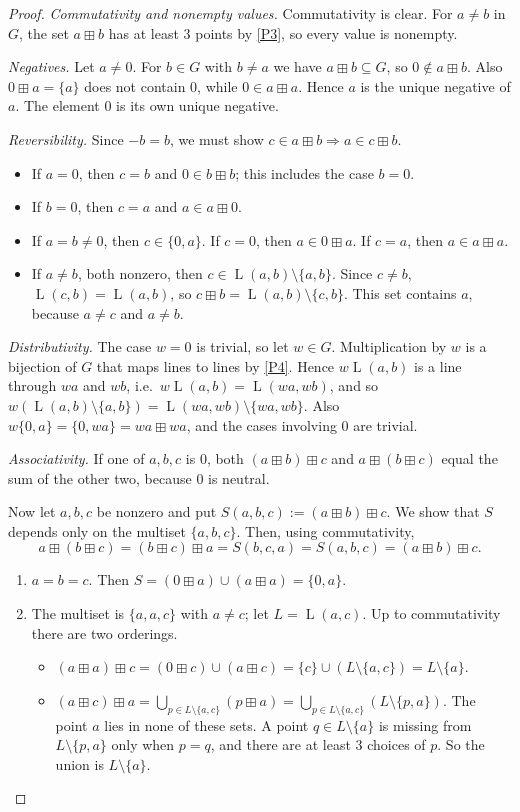 \documentclass[11pt]{article}
\theoremstyle{definition}
\theoremstyle{remark}
\newcommand{\bp}{\boxplus}
\DeclareMathOperator{\Ln}{L}
\begin{document}
\begin{proof}
\emph{Commutativity and nonempty values.} Commutativity is clear. For $a\neq b$ in $G$, the set $a\bp b$ has at least $3$ points by \ref{P3}, so every value is nonempty.

\emph{Negatives.} Let $a\neq0$. For $b\in G$ with $b\neq a$ we have $a\bp b\subseteq G$, so $0\notin a\bp b$. Also $0\bp a=\{a\}$ does not contain $0$, while $0\in a\bp a$. Hence $a$ is the unique negative of $a$. The element $0$ is its own unique negative.

\emph{Reversibility.} Since $-b=b$, we must show $c\in a\bp b\Rightarrow a\in c\bp b$.
\begin{itemize}[nosep]
\item If $a=0$, then $c=b$ and $0\in b\bp b$; this includes the case $b=0$.
\item If $b=0$, then $c=a$ and $a\in a\bp 0$.
\item If $a=b\neq0$, then $c\in\{0,a\}$. If $c=0$, then $a\in 0\bp a$. If $c=a$, then $a\in a\bp a$.
\item If $a\neq b$, both nonzero, then $c\in\Ln(a,b)\setminus\{a,b\}$. Since $c\neq b$, $\Ln(c,b)=\Ln(a,b)$, so $c\bp b=\Ln(a,b)\setminus\{c,b\}$. This set contains $a$, because $a\neq c$ and $a\neq b$.
\end{itemize}

\emph{Distributivity.} The case $w=0$ is trivial, so let $w\in G$. Multiplication by $w$ is a bijection of $G$ that maps lines to lines by \ref{P4}. Hence $w\Ln(a,b)$ is a line through $wa$ and $wb$, i.e.\ $w\Ln(a,b)=\Ln(wa,wb)$, and so $w(\Ln(a,b)\setminus\{a,b\})=\Ln(wa,wb)\setminus\{wa,wb\}$. Also $w\{0,a\}=\{0,wa\}=wa\bp wa$, and the cases involving $0$ are trivial.

\emph{Associativity.} If one of $a,b,c$ is $0$, both $(a\bp b)\bp c$ and $a\bp(b\bp c)$ equal the sum of the other two, because $0$ is neutral.

Now let $a,b,c$ be nonzero and put $S(a,b,c):=(a\bp b)\bp c$. We show that $S$ depends only on the multiset $\{a,b,c\}$. Then, using commutativity,
\[
a\bp(b\bp c)=(b\bp c)\bp a=S(b,c,a)=S(a,b,c)=(a\bp b)\bp c.
\]
\begin{enumerate}[label=\textup{Case \arabic*.},ref=\arabic*,leftmargin=*]
\item\label{case1} $a=b=c$. Then $S=(0\bp a)\cup(a\bp a)=\{0,a\}$.

\item\label{case2} The multiset is $\{a,a,c\}$ with $a\neq c$; let $L=\Ln(a,c)$. Up to commutativity there are two orderings.
\begin{itemize}[nosep]
\item $(a\bp a)\bp c=(0\bp c)\cup(a\bp c)=\{c\}\cup(L\setminus\{a,c\})=L\setminus\{a\}$.
\item $(a\bp c)\bp a=\bigcup_{p\in L\setminus\{a,c\}}(p\bp a)=\bigcup_{p\in L\setminus\{a,c\}}(L\setminus\{p,a\})$. The point $a$ lies in none of these sets. A point $q\in L\setminus\{a\}$ is missing from $L\setminus\{p,a\}$ only when $p=q$, and there are at least $3$ choices of $p$. So the union is $L\setminus\{a\}$.
\end{itemize}


\end{enumerate}
\end{proof}
\end{document}
